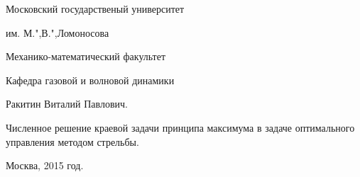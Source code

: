 \begin{titlepage}
\thispagestyle{empty}
\setcounter{page}{0}
\begin{center}{
\Large Московский государственый университет 

им. М.",В.",Ломоносова

Механико-математический факультет

Кафедра газовой и волновой динамики}
\end{center}
\vspace{120pt}
\begin{center}
\Large Ракитин Виталий Павлович.
\end{center}
\vspace{20pt}
\begin{center}{\LARGE Численное решение краевой задачи принципа максимума в задаче оптимального управления методом стрельбы.}
\end{center}

\vspace{80pt}

\vfill
\begin{center}
Москва, 2015 год.
\end{center}
\end{titlepage}
